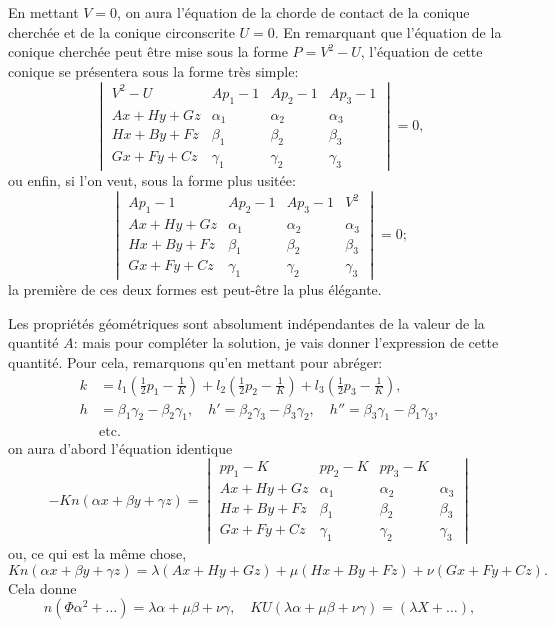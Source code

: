 \documentclass[12pt,a4paper]{article}
\theoremstyle{definition}
\begin{document}
En mettant $V = 0$, on aura l'\'{e}quation de la chorde de contact de la conique cherch\'{e}e et de la conique circonscrite $U = 0$. En remarquant que l'\'{e}quation de la conique cherch\'{e}e peut \^{e}tre mise sous la forme $P = V^2 - U$, l'\'{e}quation de cette conique se pr\'{e}sentera sous la forme tr\`{e}s simple:
\begin{equation}\tag{17}
\begin{vmatrix}
V^2 - U & Ap_1 - 1 & Ap_2 - 1 & Ap_3 - 1 \\
Ax + Hy + Gz & \alpha_1 & \alpha_2 & \alpha_3 \\
Hx + By + Fz & \beta_1 & \beta_2 & \beta_3 \\
Gx + Fy + Cz & \gamma_1 & \gamma_2 & \gamma_3
\end{vmatrix} = 0,
\end{equation}
ou enfin, si l'on veut, sous la forme plus usit\'{e}e:
\begin{equation}\tag{18}
\begin{vmatrix}
Ap_1 - 1 & Ap_2 - 1 & Ap_3 - 1 & V^2 \\
Ax + Hy + Gz & \alpha_1 & \alpha_2 & \alpha_3 \\
Hx + By + Fz & \beta_1 & \beta_2 & \beta_3 \\
Gx + Fy + Cz & \gamma_1 & \gamma_2 & \gamma_3
\end{vmatrix} = 0;
\end{equation}
la premi\`{e}re de ces deux formes est peut-\^{e}tre la plus \'{e}l\'{e}gante.

Les propri\'{e}t\'{e}s g\'{e}om\'{e}triques sont absolument ind\'{e}pendantes de la valeur de la quantit\'{e} $A$: mais pour compl\'{e}ter la solution, je vais donner l'expression de cette quantit\'{e}. Pour cela, remarquons qu'en mettant pour abr\'{e}ger:
\begin{equation}\tag{19}
\begin{aligned}
k &= l_1(\tfrac{1}{2}p_1 - \tfrac{1}{K}) + l_2(\tfrac{1}{2}p_2 - \tfrac{1}{K}) + l_3(\tfrac{1}{2}p_3 - \tfrac{1}{K}), \\
h &= \beta_1 \gamma_2 - \beta_2 \gamma_1, \quad h' = \beta_2 \gamma_3 - \beta_3 \gamma_2, \quad h'' = \beta_3 \gamma_1 - \beta_1 \gamma_3, \\
&\text{etc.}
\end{aligned}
\end{equation}
on aura d'abord l'\'{e}quation identique
\[
-Kn(\alpha x + \beta y + \gamma z) =
\begin{vmatrix}
pp_1 - K & pp_2 - K & pp_3 - K \\
Ax + Hy + Gz & \alpha_1 & \alpha_2 & \alpha_3 \\
Hx + By + Fz & \beta_1 & \beta_2 & \beta_3 \\
Gx + Fy + Cz & \gamma_1 & \gamma_2 & \gamma_3
\end{vmatrix}
\]
ou, ce qui est la m\^{e}me chose,
\[
Kn(\alpha x + \beta y + \gamma z) = \lambda(Ax + Hy + Gz) + \mu(Hx + By + Fz) + \nu(Gx + Fy + Cz).
\]
Cela donne
\[
n(\Phi \alpha^2 + \ldots) = \lambda \alpha + \mu \beta + \nu \gamma, \quad KU(\lambda \alpha + \mu \beta + \nu \gamma) = (\lambda X + \ldots),
\]
\end{document}
